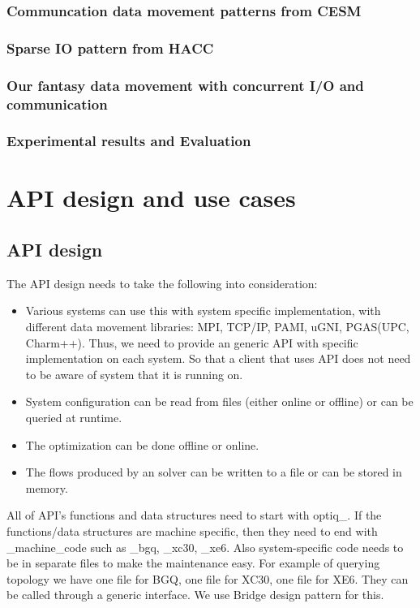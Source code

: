 \documentclass[letter]{article}
\begin{document}
\subsubsection{Communcation data movement patterns from CESM}
\subsubsection{Sparse IO pattern from HACC}
\subsubsection{Our fantasy data movement with concurrent I/O and communication}

\subsubsection{Experimental results and Evaluation}

\section{API design and use cases}
\subsection{API design}
The API design needs to take the following into consideration:

\begin{itemize}
	\item Various systems can use this with system specific implementation, with different data movement libraries: MPI, TCP/IP, PAMI, uGNI, PGAS(UPC, Charm++). Thus, we need to provide an generic API with specific implementation on each system. So that a client that uses API does not need to be aware of system that it is running on.
	\item System configuration can be read from files (either online or offline) or can be queried at runtime.
	\item The optimization can be done offline or online.
	\item The flows produced by an solver can be written to a file or can be stored in memory.
\end{itemize}

All of API's functions and data structures need to start with optiq\_. If the functions/data structures are machine specific, then they need to end with \_machine\_code such as \_bgq, \_xc30, \_xe6. Also system-specific code needs to be in separate files to make the maintenance easy. For example of querying topology we have one file for BGQ, one file for XC30, one file for XE6. They can be called through a generic interface. We use Bridge design pattern for this.
\end{document}
